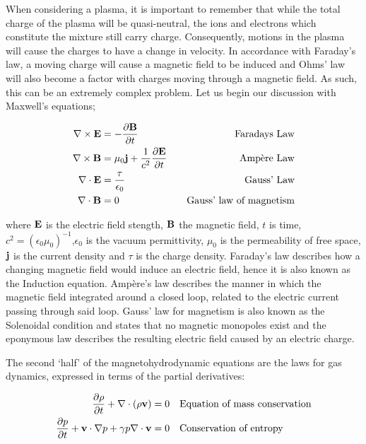 When considering a plasma, it is important to remember that while the total charge of the plasma will be quasi-neutral, the ions and electrons which constitute the mixture still carry charge.
Consequently, motions in the plasma will cause the charges to have a change in velocity.
In accordance with Faraday's law, a moving charge will cause a magnetic field to be induced and Ohms' law will also become a factor with charges moving through a magnetic field.
As such, this can be an extremely complex problem. 
Let us begin our discussion with Maxwell's equations;

\begin{align}
	\nabla \times \mathbf{E} &= -\frac{\partial \mathbf{B}}{\partial t }  &\quad \textnormal{Faradays Law}\\
	\nabla \times \mathbf{B} &= \mu_0\mathbf{j} + \frac{1}{c^2}\frac{\partial \mathbf{E}}{\partial t } &\quad \textnormal{Amp{\`e}re Law}\\
	\nabla\cdot\mathbf{E} &= \frac{\tau}{\epsilon_0} &\quad \textnormal{Gauss' Law}\\
	\nabla\cdot\mathbf{B} &= 0 & \quad \textnormal{Gauss' law of magnetism}\\
\end{align}

\noindent where $\mathbf{E}$ is the electric field stength, $\mathbf{B}$ the magnetic field, $t$ is time, $c^2 = (\epsilon_0\mu_0)^{-1}$,$\epsilon_0$ is the vacuum permittivity, $\mu_0$ is the permeability of free space, $\mathbf{j}$ is the current density and $\tau$ is the charge density.
Faraday's law describes how a changing magnetic field would induce an electric field, hence it is also known as the Induction equation.
Amp{\`e}re's law describes the manner in which the magnetic field integrated around a closed loop, related to the electric current passing through said loop.
Gauss' law for magnetism is also known as the Solenoidal condition and states that no magnetic monopoles exist and the eponymous law describes the resulting electric field caused by an electric charge.

The second `half' of the magnetohydrodynamic equations are the laws for gas dynamics, expressed in terms of the partial derivatives:

\begin{align}
	\frac{\partial \rho}{\partial t } + \nabla \cdot (\rho\mathbf{v}) = 0 & \quad\textnormal{Equation of mass conservation}\\
	\frac{\partial p}{\partial t } + \mathbf{v}\cdot\nabla p + \gamma p\nabla\cdot\mathbf{v} = 0 & \quad \textnormal{Conservation of entropy}
\end{align}


